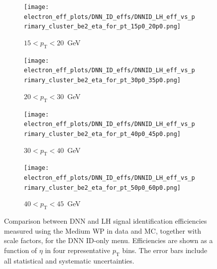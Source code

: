 \begin{figure}[htbp]
  \centering

  \begin{subfigure}[b]{0.48\textwidth}
    \centering
    \texttt{[image: electron\_eff\_plots/DNN\_ID\_effs/DNNID\_LH\_eff\_vs\_primary\_cluster\_be2\_eta\_for\_pt\_15p0\_20p0.png]}
    \caption{$15 < p_{\mathrm{T}} < 20$~GeV}
    \label{fig:eff_dnn_lh_ptbin1}
  \end{subfigure}
  \hfill
  \begin{subfigure}[b]{0.48\textwidth}
    \centering
    \texttt{[image: electron\_eff\_plots/DNN\_ID\_effs/DNNID\_LH\_eff\_vs\_primary\_cluster\_be2\_eta\_for\_pt\_30p0\_35p0.png]}
    \caption{$20 < p_{\mathrm{T}} < 30$~GeV}
    \label{fig:eff_dnn_lh_ptbin2}
  \end{subfigure}

  \vspace{0.5cm}

  \begin{subfigure}[b]{0.48\textwidth}
    \centering
    \texttt{[image: electron\_eff\_plots/DNN\_ID\_effs/DNNID\_LH\_eff\_vs\_primary\_cluster\_be2\_eta\_for\_pt\_40p0\_45p0.png]}
    \caption{$30 < p_{\mathrm{T}} < 40$~GeV}
    \label{fig:eff_dnn_lh_ptbin3}
  \end{subfigure}
  \hfill
  \begin{subfigure}[b]{0.48\textwidth}
    \centering
    \texttt{[image: electron\_eff\_plots/DNN\_ID\_effs/DNNID\_LH\_eff\_vs\_primary\_cluster\_be2\_eta\_for\_pt\_50p0\_60p0.png]}
    \caption{$40 < p_{\mathrm{T}} < 45$~GeV}
    \label{fig:eff_dnn_lh_ptbin4}
  \end{subfigure}

  \caption{
    Comparison between DNN and LH signal identification efficiencies measured using the Medium WP in data and MC, 
    together with scale factors, for the DNN ID-only menu. 
    Efficiencies are shown as a function of $\eta$ in four representative $p_{\mathrm{T}}$ bins. 
    The error bars include all statistical and systematic uncertainties.}
  \label{fig:eff_sfs_dnn_vs_lh_eta_4ptbins}
\end{figure}


